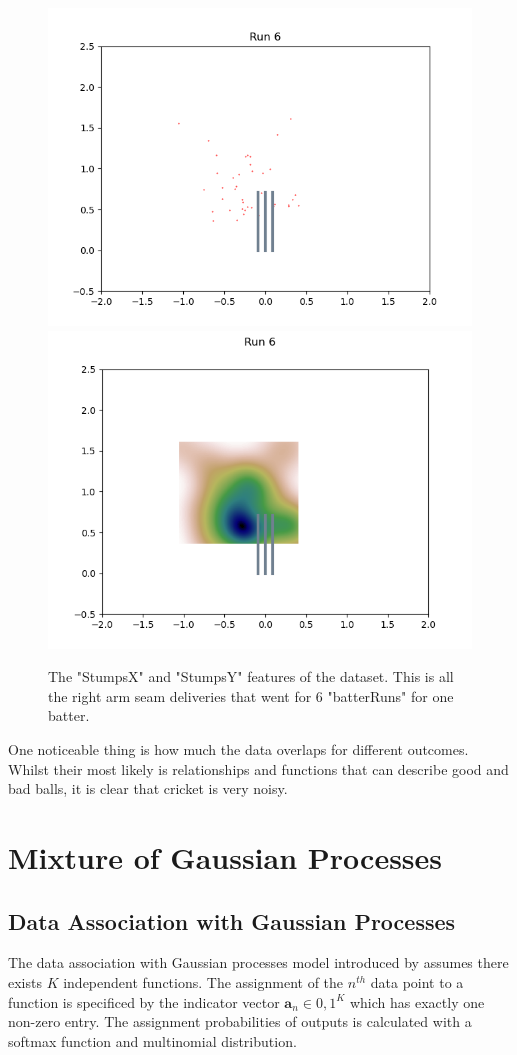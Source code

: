 \documentclass[12pt,a4paper]{report}
\theoremstyle{definition}
\begin{document}
\begin{figure}[H]
    \centering
    \includegraphics[width=0.49\linewidth]{jos_buttler_6_runs_right_arm_seam_stumps.png}
    \includegraphics[width=0.49\linewidth]{jos_buttler_6_runs_right_arm_seam_stumps_heat_map.png}
    \caption{The "StumpsX" and "StumpsY" features of the dataset. This is all the right arm seam deliveries that went for 6 "batterRuns" for one batter.}
    \label{fig:StumpsXY6Runs}
\end{figure}

One noticeable thing is how much the data overlaps for different outcomes. 
Whilst their most likely is relationships and functions that can describe good and bad balls, it is clear that cricket is very noisy.

\section{Mixture of Gaussian Processes}

\subsection{Data Association with Gaussian Processes}

The data association with Gaussian processes model introduced by \citet{Kaiser2018} assumes there exists $K$ independent functions.
The assignment of the $n^{th}$ data point to a function is specificed by the indicator vector $\textbf{a}_{n} \in {0, 1}^K$ which has exactly one non-zero entry.
The assignment probabilities of outputs is calculated with a softmax function and multinomial distribution. 
\end{document}
